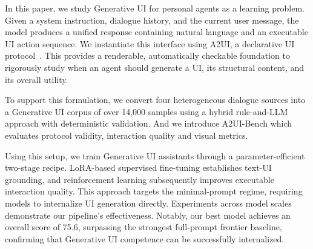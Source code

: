
In this paper, we study Generative UI for personal agents as a learning problem. Given a system instruction, dialogue history, and the current user message, the model produces a unified response containing natural language and an executable UI action sequence. We instantiate this interface using A2UI, a declarative UI protocol~\citep{a2ui_v08}. This provides a renderable, automatically checkable foundation to rigorously study when an agent should generate a UI, its structural content, and its overall utility.

To support this formulation, we convert four heterogeneous dialogue sources into a Generative UI corpus of over 14,000 samples using a hybrid rule-and-LLM approach with deterministic validation. And we introduce A2UI-Bench which evaluates protocol validity, interaction quality and visual metrics.

Using this setup, we train Generative UI assistants through a parameter-efficient two-stage recipe. LoRA-based supervised fine-tuning establishes text-UI grounding, and reinforcement learning subsequently improves executable interaction quality. This approach targets the minimal-prompt regime, requiring models to internalize UI generation directly. Experiments across model scales demonstrate our pipeline's effectiveness.
Notably, our best model achieves an overall score of 75.6, surpassing the strongest full-prompt frontier baseline, confirming that Generative UI competence can be successfully internalized.

